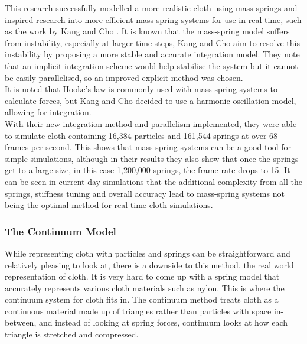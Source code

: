 \documentclass[12pt,a4paper]{article}
\begin{document}
This research successfully modelled a more realistic cloth using mass-springs and inspired research into more efficient mass-spring systems for use in real time, such as the work by Kang and Cho \cite{kang2012photorealistic}. It is known that the mass-spring model suffers from instability, especially at larger time steps, Kang and Cho aim to resolve this instability by proposing a more stable and accurate integration model. They note that an implicit integration scheme would help stabilise the system but it cannot be easily parallelised, so an improved explicit method was chosen. \\

It is noted that Hooke's law is commonly used with mass-spring systems to calculate forces, but Kang and Cho decided to use a harmonic oscillation model, allowing for integration.\\
With their new integration method and parallelism implemented, they were able to simulate cloth containing 16,384 particles and 161,544 springs at  over 68 frames per second. This shows that mass spring systems can be a good tool for simple simulations, although in their results they also show that once the springs get to a large size, in this case 1,200,000 springs, the frame rate drops to 15. It can be seen in current day simulations that the additional complexity from all the springs, stiffness tuning and overall accuracy lead to mass-spring systems not being the optimal method for real time cloth simulations.

\subsubsection{The Continuum Model}
While representing cloth with particles and springs can be straightforward and relatively pleasing to look at, there is a downside to this method, the real world representation of cloth. It is very hard to come up with a spring model that accurately represents various cloth materials such as nylon. This is where the continuum system for cloth fits in. The continuum method treats cloth as a continuous material made up of triangles rather than particles with space in-between, and instead of looking at spring forces, continuum looks at how each triangle is stretched and compressed. \\
\end{document}
